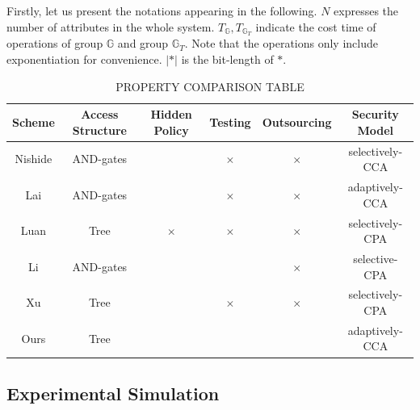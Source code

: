 \documentclass[smallextended]{svjour3}       %
\begin{document}
Firstly, let us present the notations appearing in the following. $N$ expresses the number of attributes in the whole system. $T_{\mathbb{G}},T_{\mathbb{G}_T}$ indicate the cost time of operations of group $\mathbb{G}$ and group $\mathbb{G}_T$. Note that the operations only include exponentiation for convenience. $|*|$ is the bit-length of $*$. 
\begin{table}[h] 
	\caption{PROPERTY COMPARISON TABLE}
	\resizebox{\textwidth}{13mm}
	{
	\begin{tabular}{cccccc}
	\toprule[1.5pt]
	\textbf{Scheme} & \textbf{Access Structure} & \textbf{Hidden Policy} & \textbf{Testing} & \textbf{Outsourcing} & \textbf{Security Model} \\ %
	\midrule %
	Nishide & AND-gates & \checkmark & $\times$ & $\times$ & selectively-CCA \\
	Lai     & AND-gates & \checkmark & $\times$ & $\times$  & adaptively-CCA \\
	Luan    & Tree & $\times$ & $\times$ & $\times$ & selectively-CPA \\
	Li		& AND-gates & \checkmark & \checkmark & $\times$ &  selective-CPA\\
	Xu		& Tree		& \checkmark & $\times$   & $\times$ & selectively-CPA\\	
	Ours    & Tree & \checkmark & \checkmark & \checkmark & adaptively-CCA \\
	\bottomrule[1.5pt]
	\end{tabular}
	}
	\label{propertyTable}
\end{table}

\subsection{Experimental Simulation}
\end{document}
